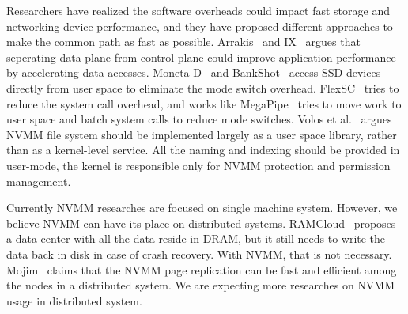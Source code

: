 Researchers have realized the software overheads could impact
fast storage and networking device performance,
and they have proposed different approaches to make the common path as fast
as possible.
Arrakis~\cite{Arrakis} and IX~\cite{IX} argues that seperating data plane
from control plane could improve application performance by accelerating
data accesses. Moneta-D~\cite{monetad} and BankShot~\cite{BankShot} access
SSD devices directly from user space to eliminate the mode switch overhead.
FlexSC~\cite{FlexSC} tries to reduce the system call overhead,
and works like MegaPipe~\cite{MegaPipe} tries to move work to user space and
batch system calls to reduce mode switches. Volos et al.~\cite{system-scm}
argues
NVMM file system should be implemented largely as a user space library, rather
than as a kernel-level service. All the naming and indexing should be provided
in user-mode, the kernel is responsible only for NVMM protection and permission
management.

Currently NVMM researches are focused on single machine system. However,
we believe NVMM can have its place on distributed systems.
RAMCloud~\cite{RAMCloud} proposes a data center with all the data reside in DRAM, but it still needs to write the data back in disk in case of crash recovery.
With NVMM, that is not necessary. Mojim~\cite{mojim} claims that the NVMM page
replication can be fast and efficient among the nodes in a distributed system.
We are expecting more researches on NVMM usage in distributed system.

